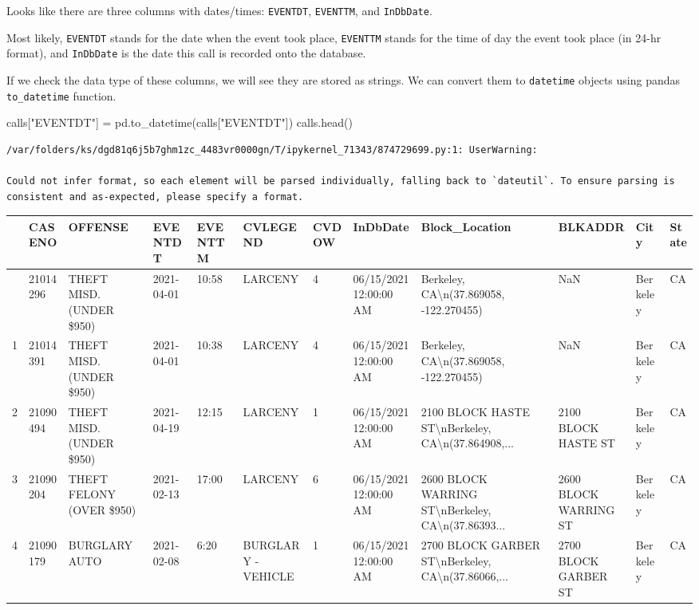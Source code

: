 \documentclass[
  letterpaper,
  DIV=11,
  numbers=noendperiod]{scrreprt}
\newenvironment{Shaded}{\begin{snugshade}}{\end{snugshade}}
\newcommand{\NormalTok}[1]{\textcolor[rgb]{0.00,0.23,0.31}{#1}}
\newcommand{\OperatorTok}[1]{\textcolor[rgb]{0.37,0.37,0.37}{#1}}
\newcommand{\StringTok}[1]{\textcolor[rgb]{0.13,0.47,0.30}{#1}}
\begin{document}
Looks like there are three columns with dates/times: \texttt{EVENTDT},
\texttt{EVENTTM}, and \texttt{InDbDate}.

Most likely, \texttt{EVENTDT} stands for the date when the event took
place, \texttt{EVENTTM} stands for the time of day the event took place
(in 24-hr format), and \texttt{InDbDate} is the date this call is
recorded onto the database.

If we check the data type of these columns, we will see they are stored
as strings. We can convert them to \texttt{datetime} objects using
pandas \texttt{to\_datetime} function.

\begin{Shaded}
\begin{Highlighting}[]
\NormalTok{calls[}\StringTok{"EVENTDT"}\NormalTok{] }\OperatorTok{=}\NormalTok{ pd.to\_datetime(calls[}\StringTok{"EVENTDT"}\NormalTok{])}
\NormalTok{calls.head()}
\end{Highlighting}
\end{Shaded}

\begin{verbatim}
/var/folders/ks/dgd81q6j5b7ghm1zc_4483vr0000gn/T/ipykernel_71343/874729699.py:1: UserWarning:

Could not infer format, so each element will be parsed individually, falling back to `dateutil`. To ensure parsing is consistent and as-expected, please specify a format.
\end{verbatim}

\begin{longtable}[]{@{}llllllllllll@{}}
\toprule\noalign{}
& CASENO & OFFENSE & EVENTDT & EVENTTM & CVLEGEND & CVDOW & InDbDate &
Block\_Location & BLKADDR & City & State \\
\midrule\noalign{}
\endhead
\bottomrule\noalign{}
\endlastfoot
0 & 21014296 & THEFT MISD. (UNDER \$950) & 2021-04-01 & 10:58 & LARCENY
& 4 & 06/15/2021 12:00:00 AM & Berkeley, CA\textbackslash n(37.869058,
-122.270455) & NaN & Berkeley & CA \\
1 & 21014391 & THEFT MISD. (UNDER \$950) & 2021-04-01 & 10:38 & LARCENY
& 4 & 06/15/2021 12:00:00 AM & Berkeley, CA\textbackslash n(37.869058,
-122.270455) & NaN & Berkeley & CA \\
2 & 21090494 & THEFT MISD. (UNDER \$950) & 2021-04-19 & 12:15 & LARCENY
& 1 & 06/15/2021 12:00:00 AM & 2100 BLOCK HASTE
ST\textbackslash nBerkeley, CA\textbackslash n(37.864908,... & 2100
BLOCK HASTE ST & Berkeley & CA \\
3 & 21090204 & THEFT FELONY (OVER \$950) & 2021-02-13 & 17:00 & LARCENY
& 6 & 06/15/2021 12:00:00 AM & 2600 BLOCK WARRING
ST\textbackslash nBerkeley, CA\textbackslash n(37.86393... & 2600 BLOCK
WARRING ST & Berkeley & CA \\
4 & 21090179 & BURGLARY AUTO & 2021-02-08 & 6:20 & BURGLARY - VEHICLE &
1 & 06/15/2021 12:00:00 AM & 2700 BLOCK GARBER
ST\textbackslash nBerkeley, CA\textbackslash n(37.86066,... & 2700 BLOCK
GARBER ST & Berkeley & CA \\
\end{longtable}
\end{document}
